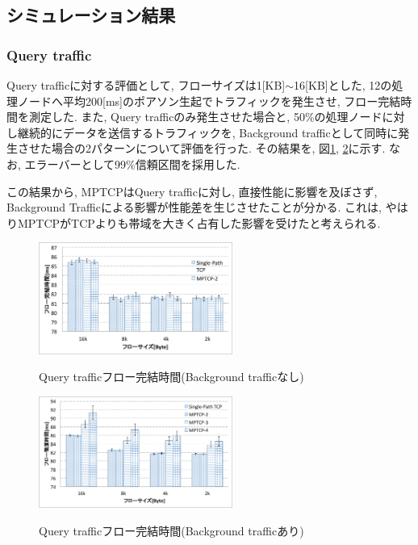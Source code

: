 \documentclass[technicalreport]{ieicej}
\begin{document}
\subsection{シミュレーション結果}

\subsubsection{Query traffic}
Query trafficに対する評価として, フローサイズは1[KB]$\sim$16[KB]とした,
12の処理ノードへ平均200[ms]のポアソン生起でトラフィックを発生させ, フロー完結時間を測定した.
また, Query trafficのみ発生させた場合と, 50\%の処理ノードに対し継続的にデータを送信するトラフィックを, Background
trafficとして同時に発生させた場合の2パターンについて評価を行った.
その結果を, 図\ref{fig:pure_query}, \ref{fig:mix_query}に示す.
なお, エラーバーとして99\%信頼区間を採用した.

この結果から, MPTCPはQuery trafficに対し, 直接性能に影響を及ぼさず, Background
Trafficによる影響が性能差を生じさせたことが分かる.
これは, やはりMPTCPがTCPよりも帯域を大きく占有した影響を受けたと考えられる.

\begin{figure}[h]
    \begin{center}
    \includegraphics[autoebb, width=180pt]{./img/pure_query.pdf}
    \caption{Query trafficフロー完結時間(Background trafficなし)}
    \label{fig:pure_query}
    \end{center}
\end{figure}

\begin{figure}[h]
    \begin{center}
    \includegraphics[autoebb, width=180pt]{./img/mix_query.pdf}
    \caption{Query trafficフロー完結時間(Background trafficあり)}
    \label{fig:mix_query}
    \end{center}
\end{figure}
\hspace{1cm}
\end{document}
